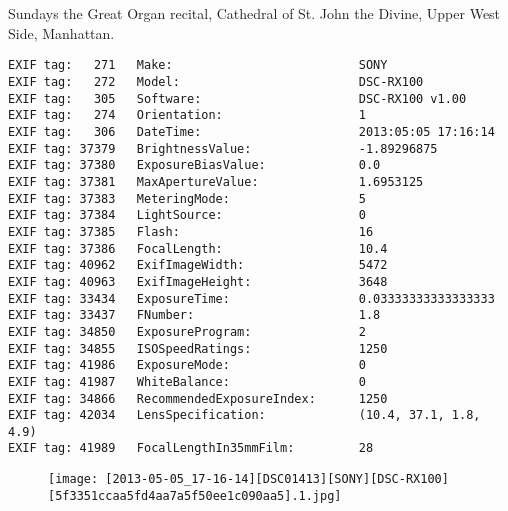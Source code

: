 \section{\protect{}}
\noindent Sundays the Great Organ recital, Cathedral of St. John the Divine, Upper West Side, Manhattan.
\noindent
\begin{lstlisting}
EXIF tag:   271   Make:                          SONY
EXIF tag:   272   Model:                         DSC-RX100
EXIF tag:   305   Software:                      DSC-RX100 v1.00
EXIF tag:   274   Orientation:                   1
EXIF tag:   306   DateTime:                      2013:05:05 17:16:14
EXIF tag: 37379   BrightnessValue:               -1.89296875
EXIF tag: 37380   ExposureBiasValue:             0.0
EXIF tag: 37381   MaxApertureValue:              1.6953125
EXIF tag: 37383   MeteringMode:                  5
EXIF tag: 37384   LightSource:                   0
EXIF tag: 37385   Flash:                         16
EXIF tag: 37386   FocalLength:                   10.4
EXIF tag: 40962   ExifImageWidth:                5472
EXIF tag: 40963   ExifImageHeight:               3648
EXIF tag: 33434   ExposureTime:                  0.03333333333333333
EXIF tag: 33437   FNumber:                       1.8
EXIF tag: 34850   ExposureProgram:               2
EXIF tag: 34855   ISOSpeedRatings:               1250
EXIF tag: 41986   ExposureMode:                  0
EXIF tag: 41987   WhiteBalance:                  0
EXIF tag: 34866   RecommendedExposureIndex:      1250
EXIF tag: 42034   LensSpecification:             (10.4, 37.1, 1.8, 4.9)
EXIF tag: 41989   FocalLengthIn35mmFilm:         28

\end{lstlisting}
\clearpage
\begin{figure}
\raggedleft
\texttt{[image: [2013-05-05\_17-16-14][DSC01413][SONY][DSC-RX100][5f3351ccaa5fd4aa7a5f50ee1c090aa5].1.jpg]}
\end{figure}


\clearpage
